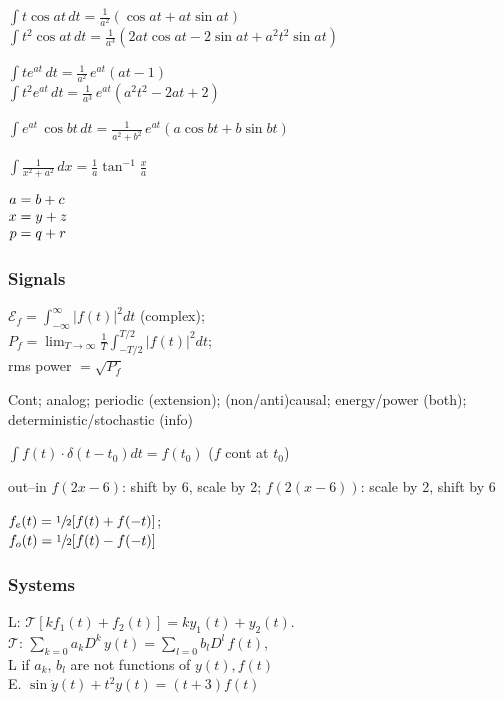 \documentclass[4pt]{article}
\theoremstyle{definition}
\theoremstyle{definition}
\newcommand{\ra}{\rightarrow}
\begin{document}
\begin{landscape}
\begin{multicols}{3}
    $\int t \cos at \, dt = \frac{1}{a^2}(\cos at + at\sin at)$\\
    $\int t^2 \cos at\, dt = \frac{1}{a^3}(2at\cos at - 2\sin at + a^2t^2\sin at)$

    $\int te^{at}\, dt = \frac{1}{a^2} \, e^{at} (at-1)$\\
    $\int t^2 e^{at} \, dt = \frac{1}{a^3} \, e^{at} (a^2t^2 - 2at + 2)$

    $\int e^{at} \,\cos bt \, dt = \frac{1}{a^2+b^2} \,e^{at}(a\cos 
    bt + b \sin bt)$

    \(\int \frac{1} {x^2+a^2}\, dx = \frac{1}{a} \tan^{-1} \frac x a\)

    \(
        \setlength{\jot}{0pt} %
\begin{aligned}
    a &= b + c \\
    x &= y + z \\
    p &= q + r
\end{aligned}
\)


\columnbreak
\subsubsection*{Signals}
    $\mathcal{E}_f = \int_{-\infty}^{\infty} |f(t)|^2 dt$ (complex); \\
    $P_f = \lim_{T\ra\infty}\frac{1}{T} \int^{T/2}_{-T/2} |f(t)|^2 dt $; \\
    rms power $= \sqrt {P_f}$

    Cont; 
    analog; 
    periodic (extension); 
    (non/anti)causal; 
    energy/power (both); 
    deterministic/stochastic (info)

    $\int f(t)\cdot \delta(t - t_0) dt = f(t_0)$ ($f$ cont at $t_0$)
    

    out--in  $f(2x-6)$: shift by 6, scale by 2; $f(2(x-6))$: scale by 2, shift by 6

    $f_e(t) = \sfrac{1}{2}[f(t) + f(-t)]$; \\
    $f_o(t) = \sfrac{1}{2}[f(t) - f(-t)]$
\subsubsection*{Systems}
    L: $\mathcal{T}[kf_1(t) + f_2(t)] = ky_1(t) + y_2(t)$.\\
    $\mathcal{T}$: $\sum_{k=0}a_k D^k \, y(t) = \sum_{l=0}b_lD^l\, f(t)$,\\
    L if $a_k$, $b_l$ are not functions of $y(t), f(t)$\\
    E. $\sin\dot{y}(t) + t^2 y(t) = (t+3) f(t)$
    

\end{multicols}
\end{landscape}
\end{document}
